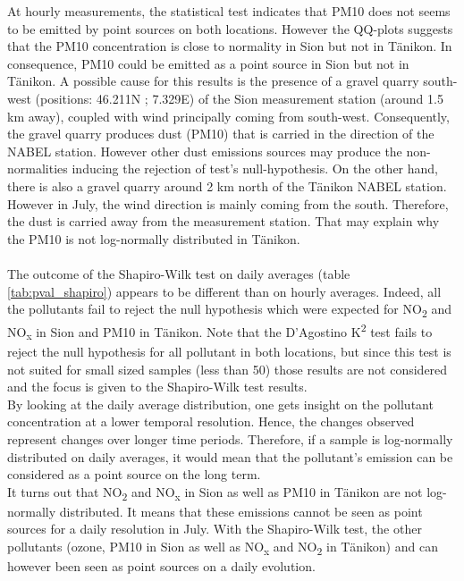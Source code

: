 \documentclass[a4paper, 12pt]{article}
\begin{document}
    At hourly measurements, the statistical test indicates that PM10 does not seems to be emitted by point sources on both locations. However the QQ-plots suggests that the PM10 concentration is close to normality in Sion but not in Tänikon. In consequence,  PM10 could be emitted as a point source in Sion but not in Tänikon. A possible cause for this results is the presence of a gravel quarry south-west (positions: 46.211N ; 7.329E) of the Sion measurement station (around 1.5 km away), coupled with wind principally coming from south-west. Consequently, the gravel quarry produces dust (PM10) that is carried in the direction of the NABEL station. However other dust emissions sources may produce the non-normalities inducing the rejection of test's null-hypothesis. On the other hand, there is also a gravel quarry around 2 km north of the Tänikon NABEL station. However in July, the wind direction is mainly coming from the south. Therefore, the dust is carried away from the measurement station. That may explain why the PM10 is not log-normally distributed in Tänikon.
    \\
    \\
    The outcome of the Shapiro-Wilk test on daily averages (table \ref{tab:pval_shapiro}) appears to be different than on hourly averages. Indeed, all the pollutants fail to reject the null hypothesis which were expected for NO\textsubscript{2} and NO\textsubscript{x} in Sion and PM10 in Tänikon. Note that the D’Agostino K\textsuperscript{2} test fails to reject the null hypothesis for all pollutant in both locations, but since this test is not suited for small sized samples (less than 50) those results are not considered and the focus is given to the Shapiro-Wilk test results. 
    \\
    By looking at the daily average distribution, one gets insight on the pollutant concentration at a lower temporal resolution. Hence, the changes observed represent changes over longer time periods. Therefore, if a sample is log-normally distributed on daily averages, it would mean that the pollutant's emission can be considered as a point source on the long term.
    \\
    It turns out that NO\textsubscript{2} and NO\textsubscript{x} in Sion as well as PM10 in Tänikon are not log-normally distributed. It means that these emissions cannot be seen as point sources for a daily resolution in July. With the Shapiro-Wilk test, the other pollutants (ozone, PM10 in Sion as well as NO\textsubscript{x} and NO\textsubscript{2} in Tänikon) and can however been seen as point sources on a daily evolution. 
\end{document}
